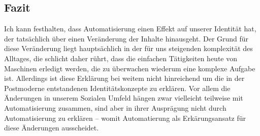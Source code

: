 \subsection {Fazit}

Ich kann festhalten, dass Automatisierung einen Effekt auf unserer Identität hat, der tatsächlich über einen Veränderung der Inhalte hinausgeht.
Der Grund für diese Veränderung liegt hauptsächlich in der für uns steigenden komplexität des Alltages, die schlicht daher rührt, dass die einfachen Tätigkeiten heute von Maschinen erledigt werden, die zu überwachen wiederum eine komplexe Aufgabe ist.
Allerdings ist diese Erklärung bei weitem nicht hinreichend um die in der Postmoderne entstandenen Identitätskonzepte zu erklären.
Vor allem die Änderungen in unserem Sozialen Umfeld hängen zwar vielleicht teilweise mit Automatisierung zusammen, sind aber in ihrer Ausprägung nicht durch Automatisierung zu erklären – womit Automatierung als Erkärungsansatz für diese Änderungen ausscheidet.
